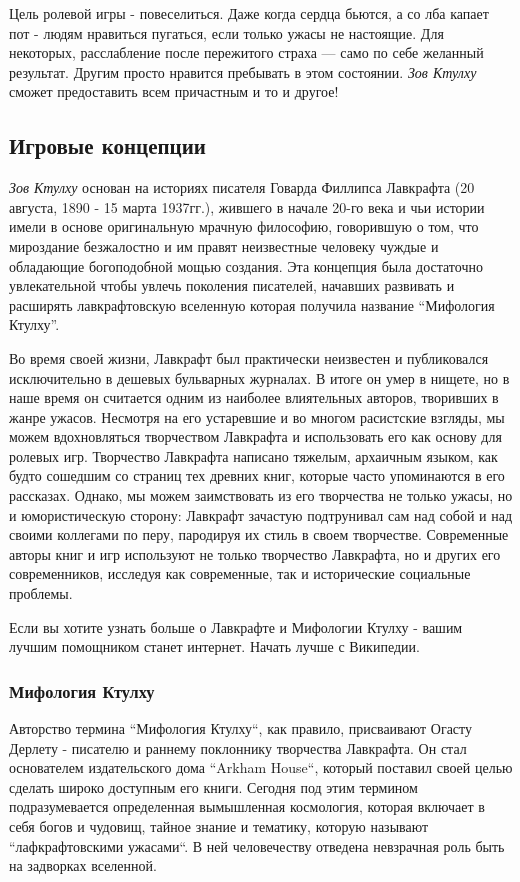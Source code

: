\documentclass[letterpaper,twocolumn,openany, twoside, 8pt, usenames]{cocbook}
\begin{document}
Цель ролевой игры - повеселиться. Даже когда сердца бьются, а со лба капает пот - людям нравиться пугаться, если только ужасы не настоящие. Для некоторых, расслабление после пережитого страха --- само по себе желанный результат. Другим просто нравится пребывать в этом состоянии. {\it Зов Ктулху} сможет предоставить всем причастным и то и другое!

\subsection*{\nohyphens{Игровые концепции}}

{\it Зов Ктулху} основан на историях писателя Говарда Филлипса Лавкрафта (20 августа, 1890 - 15 марта 1937гг.), жившего в начале 20-го века и чьи истории имели в основе оригинальную мрачную философию, говорившую о том, что мироздание безжалостно и им правят неизвестные человеку чуждые и обладающие богоподобной мощью создания. Эта концепция была достаточно увлекательной чтобы увлечь поколения писателей, начавших развивать и расширять лавкрафтовскую вселенную которая получила название ``Мифология Ктулху''.

Во время своей жизни, Лавкрафт был практически неизвестен и публиковался исключительно в дешевых бульварных журналах. В итоге он умер в нищете, но в наше время он считается одним из наиболее влиятельных авторов, творивших в жанре ужасов. Несмотря на его устаревшие и во многом расистские взгляды, мы можем вдохновляться творчеством Лавкрафта и использовать его как основу для ролевых игр. Творчество Лавкрафта написано тяжелым, архаичным языком, как будто сошедшим со страниц тех древних книг, которые часто упоминаются в его рассказах. Однако, мы можем заимствовать из его творчества не только ужасы, но и юмористическую сторону: Лавкрафт зачастую подтрунивал сам над собой и над своими коллегами по перу, пародируя их стиль в своем творчестве. Современные авторы книг и игр используют не только творчество Лавкрафта, но и других его современников, исследуя как современные, так и исторические социальные проблемы.

Если вы хотите узнать больше о Лавкрафте и Мифологии Ктулху - вашим лучшим помощником станет интернет. Начать лучше с Википедии.

\subsubsection*{\nohyphens{Мифология Ктулху}}

Авторство термина ``Мифология Ктулху``, как правило, присваивают Огасту Дерлету - писателю и раннему поклоннику творчества Лавкрафта. Он стал основателем издательского дома ``Arkham House``, который поставил своей целью сделать широко доступным его книги. Сегодня под этим термином подразумевается определенная вымышленная космология, которая включает в себя богов и чудовищ, тайное знание и тематику, которую называют ``лафкрафтовскими ужасами``. В ней человечеству отведена невзрачная роль быть на задворках вселенной.
\end{document}
